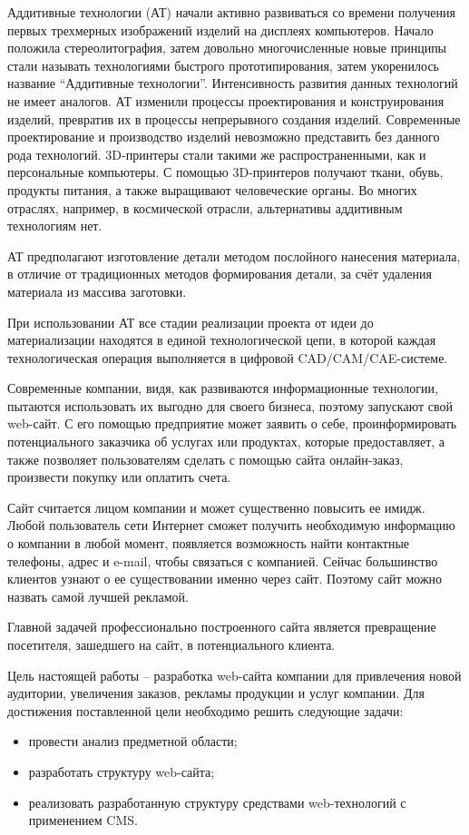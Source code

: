 \newsection
{}

Аддитивные технологии (АТ) начали активно развиваться со времени получения первых трехмерных изображений изделий на дисплеях компьютеров. Начало положила стереолитография, затем довольно многочисленные новые принципы стали называть технологиями быстрого прототипирования, затем укоренилось название ``Аддитивные технологии''. Интенсивность развития данных технологий не имеет аналогов. АТ изменили процессы проектирования и конструирования изделий, превратив их в процессы непрерывного создания изделий. Современные проектирование и производство изделий невозможно представить без данного рода технологий. 3D-принтеры стали такими же распространенными, как и персональные компьютеры. С помощью 3D-принтеров получают ткани, обувь, продукты питания, а также выращивают человеческие органы. Во многих отраслях, например, в космической отрасли, альтернативы аддитивным технологиям нет.

АТ предполагают изготовление детали методом послойного нанесения материала, в отличие от традиционных методов формирования детали, за счёт удаления материала из массива заготовки.

При использовании АТ все стадии реализации проекта от идеи до материализации находятся в единой технологической цепи, в которой каждая технологическая операция выполняется в цифровой CAD/CAM/CAE-системе.

Современные компании, видя, как развиваются информационные технологии, пытаются использовать их выгодно для своего бизнеса, поэтому запускают свой web-сайт. С его помощью предприятие может заявить о себе, проинформировать потенциального заказчика об услугах или продуктах, которые предоставляет, а также позволяет пользователям сделать с помощью сайта онлайн-заказ, произвести покупку или оплатить счета.

Сайт считается лицом компании и может существенно повысить ее имидж. Любой пользователь сети Интернет сможет получить необходимую информацию о компании в любой момент, появляется возможность найти контактные телефоны, адрес и e-mail, чтобы связаться с компанией. Сейчас большинство клиентов узнают о ее существовании именно через сайт. Поэтому сайт можно назвать самой лучшей рекламой. 

Главной задачей профессионально построенного сайта является превращение посетителя, зашедшего на сайт, в потенциального клиента.

Цель настоящей работы – разработка web-сайта компании для привлечения новой аудитории, увеличения заказов, рекламы продукции и услуг компании. Для достижения поставленной цели необходимо решить следующие задачи:
\begin{itemize}
\item провести анализ предметной области;
\item разработать структуру web-сайта;
\item реализовать разработанную структуру средствами web-технологий с \linebreak применением CMS.
\end{itemize}

